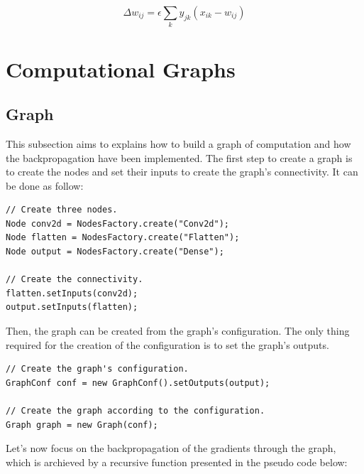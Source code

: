 \documentclass[11pt]{report}
\begin{document}
\begin{equation}
\Delta w_{ij} = \epsilon \sum_{k} y_{jk}(x_{ik} - w_{ij})
\end{equation}

\section{Computational Graphs}

\subsection{Graph}

This subsection aims to explains how to build a graph of computation and how the backpropagation have been implemented. The first step to create a graph is to create the nodes and set their inputs to create the graph's connectivity. It can be done as follow:

\begin{verbatim}
// Create three nodes.
Node conv2d = NodesFactory.create("Conv2d");
Node flatten = NodesFactory.create("Flatten");
Node output = NodesFactory.create("Dense");

// Create the connectivity.
flatten.setInputs(conv2d);
output.setInputs(flatten);
\end{verbatim}

\noindent Then, the graph can be created from the graph's configuration. The only thing required for the creation of the configuration is to set the graph's outputs.

\begin{verbatim}
// Create the graph's configuration.
GraphConf conf = new GraphConf().setOutputs(output);

// Create the graph according to the configuration.
Graph graph = new Graph(conf);
\end{verbatim}

\noindent Let's now focus on the backpropagation of the gradients through the graph, which is archieved by a recursive function presented in the pseudo code below:
\end{document}
